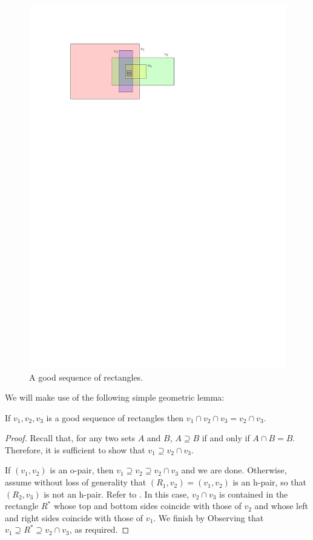 \documentclass[lotsofwhite]{patmorin}
\begin{document}
\begin{figure}
  \begin{center}
    \includegraphics{figs/good-sequence}
  \end{center}
  \caption{A good sequence of rectangles.}
\end{figure}

We will make use of the following simple geometric lemma:
\begin{lem}
  If $v_1,v_2,v_3$ is a good sequence of rectangles then
  $v_1\cap v_2\cap v_3=v_2\cap v_3$.
\end{lem}


\begin{proof}
  Recall that, for any two sets $A$ and $B$, $A\supseteq B$ if and only
  if $A\cap B = B$. Therefore, it is sufficient to show that $v_1\supseteq
  v_2\cap v_3$.

  If $(v_1,v_2)$ is an o-pair, then $v_1\supseteq v_2\supseteq v_2\cap
  v_3$ and we are done.  Otherwise, assume without loss of generality
  that $(R_1,v_2)=(v_1,v_2)$ is an h-pair, so that $(R_2,v_3)$ is not an
  h-pair. Refer to .  In this case, $v_2\cap v_3$ is
  contained in the rectangle $R^*$ whose top and bottom sides coincide
  with those of $v_2$ and whose left and right sides coincide with
  those of $v_1$. We finish by Observing that $v_1\supseteq R^*\supseteq
  v_2\cap v_3$, as required.
\end{proof}
\end{document}

